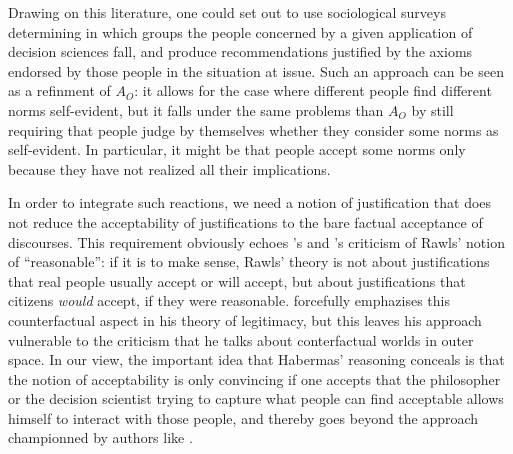 \documentclass[preprint, french, english, 11pt, authoryear]{elsarticle}%
\begin{document}
Drawing on this literature, one could set out to use sociological surveys determining in which groups the people concerned by a given application of decision sciences fall, and produce recommendations justified by the axioms endorsed by those people in the situation at issue. Such an approach can be seen as a refinment of $A_O$: it allows for the case where different people find different norms self-evident, but it falls under the same problems than $A_O$ by still requiring that people judge by themselves whether they consider some norms as self-evident. In particular, it might be that people accept some norms only because they have not realized all their implications.

In order to integrate such reactions, we need a notion of justification that does not reduce the acceptability of justifications to the bare factual acceptance of discourses. This requirement obviously echoes \cite{habermas_reconciliation_1995}'s and \cite{estlund_democratic_2009}'s criticism of Rawls' notion of “reasonable”: if it is to make sense, Rawls' theory is not about justifications that real people usually accept or will accept, but about justifications that citizens \emph{would} accept, if they were reasonable. \citet{habermas_faktizitat_1992} forcefully emphazises this counterfactual aspect in his theory of legitimacy, but this leaves his approach vulnerable to the criticism that he talks about conterfactual worlds in outer space. In our view, the important idea that Habermas' reasoning conceals is that the notion of acceptability is only convincing if one accepts that the philosopher or the decision scientist trying to capture what people can find acceptable allows himself to interact with those people, and thereby goes beyond the approach championned by authors like \cite{boltanski_justification_2006}.
\end{document}
